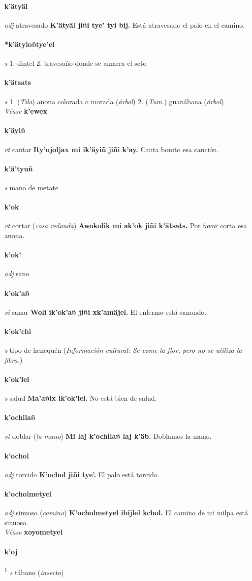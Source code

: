 \documentclass{scrbook}
\newcommand{\entry}[1]{\paragraph{#1}}
\newcommand{\onedefinition}[1]{#1.}
\newcommand{\defsuperscript}[1]{\textsuperscript{1}}
\newcommand{\partofspeech}[1]{\textit{#1}}
\newcommand{\spanishtranslation}[1]{#1}
\newcommand{\clarification}[1]{(\textit{#1})}
\newcommand{\cholexample}[1]{\textbf{#1}}
\newcommand{\exampletranslation}[1]{#1}
\newcommand{\alsosee}[1]{\\\textit{Véase} \textbf{#1}}
\newcommand{\relevantdialect}[1]{(\textit{#1})}
\newcommand{\culturalinformation}[1]{(\textit{#1})}
\begin{document}
\begin{multicols}{2}
\entry{k'ätyäl}
\partofspeech{adj}
\spanishtranslation{atravesado}
\cholexample{K'ätyäl jiñi tye' tyi bij.}
\exampletranslation{Está atravesado el palo en el camino.}

\entry{*k'ätyloñtye'el}
\partofspeech{s}
\onedefinition{1}
\spanishtranslation{dintel}
\onedefinition{2}
\spanishtranslation{travesaño donde se amarra el seto}

\entry{k'ätsats}
\partofspeech{s}
\onedefinition{1}
\relevantdialect{Tila}
\spanishtranslation{anona colorada o morada}
\clarification{árbol}
\onedefinition{2}
\relevantdialect{Tum.}
\spanishtranslation{guanábana}
\clarification{árbol}
\alsosee{k'ewex}

\entry{k'äyiñ}
\partofspeech{vt}
\spanishtranslation{cantar}
\cholexample{Ity'ojoljax mi ik'äyiñ jiñi k'ay.}
\exampletranslation{Canta bonito esa canción.}

\entry{k'ä'tyuñ}
\partofspeech{s}
\spanishtranslation{mano de metate}

\entry{k'ok}
\partofspeech{vt}
\spanishtranslation{cortar}
\clarification{cosa redonda}
\cholexample{Awokolik mi ak'ok jiñi k'ätsats.}
\exampletranslation{Por favor corta esa anona.}

\entry{k'ok'}
\partofspeech{adj}
\spanishtranslation{sano}

\entry{k'ok'añ}
\partofspeech{vi}
\spanishtranslation{sanar}
\cholexample{Woli ik'ok'añ jiñi xk'amäjel.}
\exampletranslation{El enfermo está sanando.}

\entry{k'ok'chi}
\partofspeech{s}
\spanishtranslation{tipo de henequén}
\culturalinformation{Información cultural: Se come la flor, pero no se utiliza la fibra.}

\entry{k'ok'lel}
\partofspeech{s}
\spanishtranslation{salud}
\cholexample{Ma'añix ik'ok'lel.}
\exampletranslation{No está bien de salud.}

\entry{k'ochilañ}
\partofspeech{vt}
\spanishtranslation{doblar}
\clarification{la mano}
\cholexample{Mi laj k'ochilañ laj k'äb.}
\exampletranslation{Doblamos la mano.}

\entry{k'ochol}
\partofspeech{adj}
\spanishtranslation{torcido}
\cholexample{K'ochol jiñi tye'.}
\exampletranslation{El palo está torcido.}

\entry{k'ocholmetyel}
\partofspeech{adj}
\spanishtranslation{sinuoso}
\clarification{camino}
\cholexample{K'ocholmetyel ibijlel kchol.}
\exampletranslation{El camino de mi milpa está sinuoso.}
\alsosee{xoyometyel}

\entry{k'oj}
\defsuperscript{1}
\partofspeech{s}
\spanishtranslation{tábano}
\clarification{insecto}


\end{multicols}
\end{document}
